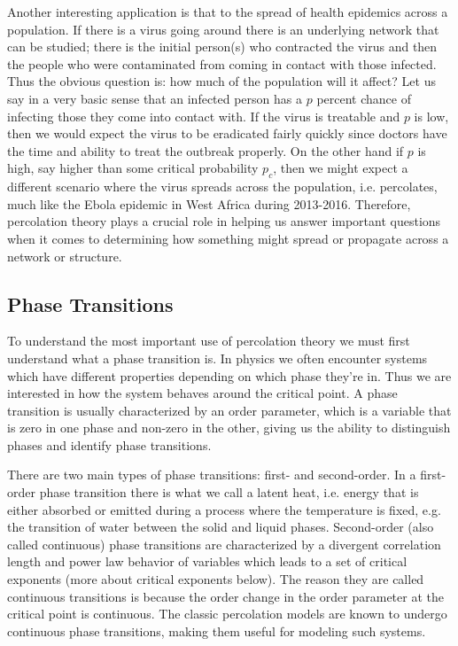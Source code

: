 Another interesting application is that to the spread of health epidemics across a population.
If there is a virus going around there is an underlying network that can be studied; there is the initial person(s) who contracted the virus and then the people who were contaminated from coming in contact with those infected.
Thus the obvious question is: how much of the population will it affect?
Let us say in a very basic sense that an infected person has a $p$ percent chance of infecting those they come into contact with.
If the virus is treatable and $p$ is low, then we would expect the virus to be eradicated fairly quickly since doctors have the time and ability to treat the outbreak properly.
On the other hand if $p$ is high, say higher than some critical probability $p_c$, then we might expect a different scenario where the virus spreads across the population, i.e. percolates, much like the Ebola epidemic in West Africa during 2013-2016.
Therefore, percolation theory plays a crucial role in helping us answer important questions when it comes to determining how something might spread or propagate across a network or structure.









\subsection{Phase Transitions}
To understand the most important use of percolation theory we must first understand what a phase transition is.
In physics we often encounter systems which have different properties depending on which phase they're in.
Thus we are interested in how the system behaves around the critical point.
A phase transition is usually characterized by an order parameter, which is a variable that is zero in one phase and non-zero in the other, giving us the ability to distinguish phases and identify phase transitions.

There are two main types of phase transitions: first- and second-order.
In a first-order phase transition there is what we call a latent heat, i.e. energy that is either absorbed or emitted during a process where the temperature is fixed, e.g. the transition of water between the solid and liquid phases.
Second-order (also called continuous) phase transitions are characterized by a divergent correlation length and power law behavior of variables which leads to a set of critical exponents (more about critical exponents below).
The reason they are called continuous transitions is because the order change in the order parameter at the critical point is continuous.
The classic percolation models are known to undergo continuous phase transitions, making them useful for modeling such systems.









